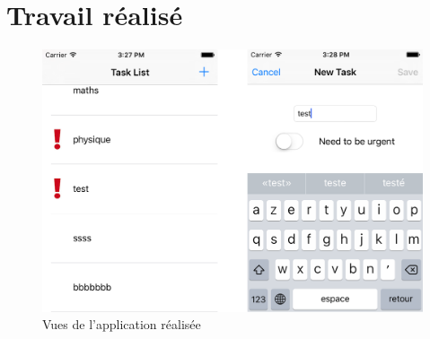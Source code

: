 \section{Travail réalisé}
\begin{figure}[H]
	\begin{center}
		\includegraphics[width=14cm]{img/simulator.png}
		\caption{Vues de l'application réalisée}
		\label{vues}
	\end{center}
\end{figure}